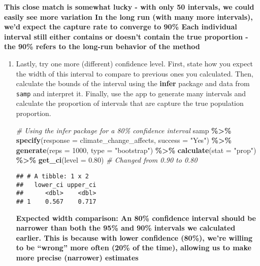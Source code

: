 \documentclass[
]{article}
\newenvironment{Shaded}{\begin{snugshade}}{\end{snugshade}}
\newcommand{\AttributeTok}[1]{\textcolor[rgb]{0.13,0.29,0.53}{#1}}
\newcommand{\CommentTok}[1]{\textcolor[rgb]{0.56,0.35,0.01}{\textit{#1}}}
\newcommand{\DecValTok}[1]{\textcolor[rgb]{0.00,0.00,0.81}{#1}}
\newcommand{\FloatTok}[1]{\textcolor[rgb]{0.00,0.00,0.81}{#1}}
\newcommand{\FunctionTok}[1]{\textcolor[rgb]{0.13,0.29,0.53}{\textbf{#1}}}
\newcommand{\NormalTok}[1]{#1}
\newcommand{\SpecialCharTok}[1]{\textcolor[rgb]{0.81,0.36,0.00}{\textbf{#1}}}
\newcommand{\StringTok}[1]{\textcolor[rgb]{0.31,0.60,0.02}{#1}}
\begin{document}
\textbf{This close match is somewhat lucky - with only 50 intervals, we
could easily see more variation In the long run (with many more
intervals), we'd expect the capture rate to converge to 90\% Each
individual interval still either contains or doesn't contain the true
proportion - the 90\% refers to the long-run behavior of the method}

\begin{enumerate}
\def\labelenumi{\arabic{enumi}.}
\item
  Lastly, try one more (different) confidence level. First, state how
  you expect the width of this interval to compare to previous ones you
  calculated. Then, calculate the bounds of the interval using the
  \textbf{infer} package and data from \texttt{samp} and interpret it.
  Finally, use the app to generate many intervals and calculate the
  proportion of intervals that are capture the true population
  proportion.

\begin{Shaded}
\begin{Highlighting}[]
\CommentTok{\# Using the infer package for a 80\% confidence interval}
\NormalTok{samp }\SpecialCharTok{\%\textgreater{}\%}
  \FunctionTok{specify}\NormalTok{(}\AttributeTok{response =}\NormalTok{ climate\_change\_affects, }\AttributeTok{success =} \StringTok{"Yes"}\NormalTok{) }\SpecialCharTok{\%\textgreater{}\%}
  \FunctionTok{generate}\NormalTok{(}\AttributeTok{reps =} \DecValTok{1000}\NormalTok{, }\AttributeTok{type =} \StringTok{"bootstrap"}\NormalTok{) }\SpecialCharTok{\%\textgreater{}\%}
  \FunctionTok{calculate}\NormalTok{(}\AttributeTok{stat =} \StringTok{"prop"}\NormalTok{) }\SpecialCharTok{\%\textgreater{}\%}
  \FunctionTok{get\_ci}\NormalTok{(}\AttributeTok{level =} \FloatTok{0.80}\NormalTok{)  }\CommentTok{\# Changed from 0.90 to 0.80}
\end{Highlighting}
\end{Shaded}

\begin{verbatim}
## # A tibble: 1 x 2
##   lower_ci upper_ci
##      <dbl>    <dbl>
## 1    0.567    0.717
\end{verbatim}

  \textbf{Expected width comparison: An 80\% confidence interval should
  be narrower than both the 95\% and 90\% intervals we calculated
  earlier. This is because with lower confidence (80\%), we're willing
  to be ``wrong'' more often (20\% of the time), allowing us to make
  more precise (narrower) estimates}
\end{enumerate}
\end{document}
